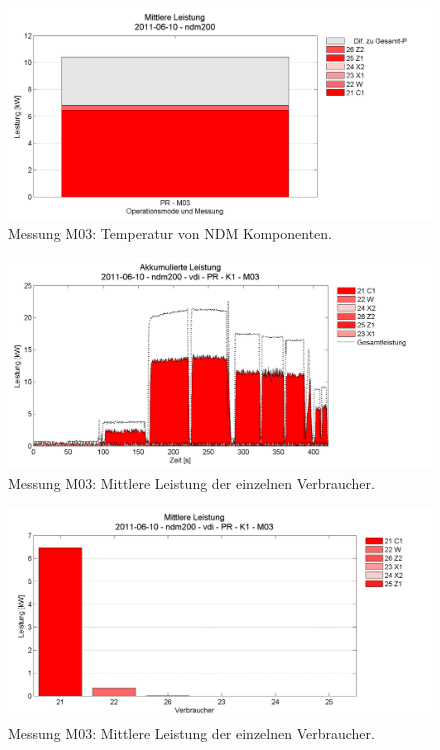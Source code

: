 \documentclass[a4paper,11pt,pdftex,twoside]{scrartcl}
\begin{document}
\begin{figure}[H]
\begin{center}
  \includegraphics[width=\columnwidth]{figures/cnc/2011-06-10_ndm200_M03_cbar.png}
  \caption{Messung M03: Temperatur von NDM Komponenten.}
  \label{fig:M04_area}
\end{center}
\end{figure}
\pagebreak

\begin{figure}[H]
\begin{center}
  \includegraphics[width=\columnwidth]{figures/cnc/2011-06-10_ndm200_vdi_PR_K1_M03_area.png}
  \caption{Messung M03: Mittlere Leistung der einzelnen Verbraucher.}
  \label{fig:M03_bar}
\end{center}
\end{figure}


\begin{figure}[H]
\begin{center}
  \includegraphics[width=\columnwidth]{figures/cnc/2011-06-10_ndm200_vdi_PR_K1_M03_bar.png}
  \caption{Messung M03: Mittlere Leistung der einzelnen Verbraucher.}
  \label{fig:M03_bar}
\end{center}
\end{figure}
\end{document}
